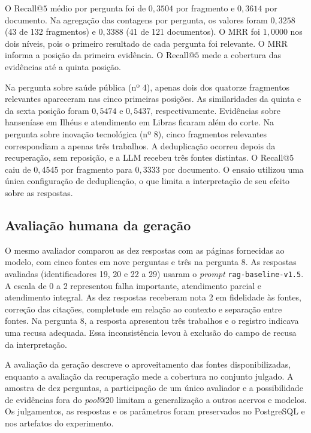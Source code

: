 O Recall@$5$ médio por pergunta foi de $0{,}3504$ por fragmento e $0{,}3614$ por documento. Na agregação das contagens por pergunta, os valores foram $0{,}3258$ (43 de 132 fragmentos) e $0{,}3388$ (41 de 121 documentos). O MRR foi $1{,}0000$ nos dois níveis, pois o primeiro resultado de cada pergunta foi relevante. O MRR informa a posição da primeira evidência. O Recall@$5$ mede a cobertura das evidências até a quinta posição.

Na pergunta sobre saúde pública (nº 4), apenas dois dos quatorze fragmentos relevantes apareceram nas cinco primeiras posições. As similaridades da quinta e da sexta posição foram $0{,}5474$ e $0{,}5437$, respectivamente. Evidências sobre hanseníase em Ilhéus e atendimento em Libras ficaram além do corte. Na pergunta sobre inovação tecnológica (nº 8), cinco fragmentos relevantes correspondiam a apenas três trabalhos. A deduplicação ocorreu depois da recuperação, sem reposição, e a LLM recebeu três fontes distintas. O Recall@$5$ caiu de $0{,}4545$ por fragmento para $0{,}3333$ por documento. O ensaio utilizou uma única configuração de deduplicação, o que limita a interpretação de seu efeito sobre as respostas.

\subsection{Avaliação humana da geração}

O mesmo avaliador comparou as dez respostas com as páginas fornecidas ao modelo, com cinco fontes em nove perguntas e três na pergunta 8. As respostas avaliadas (identificadores 19, 20 e 22 a 29) usaram o \textit{prompt} \texttt{rag-baseline-v1.5}. A escala de 0 a 2 representou falha importante, atendimento parcial e atendimento integral. As dez respostas receberam nota 2 em fidelidade às fontes, correção das citações, completude em relação ao contexto e separação entre fontes. Na pergunta 8, a resposta apresentou três trabalhos e o registro indicava uma recusa adequada. Essa inconsistência levou à exclusão do campo de recusa da interpretação.

A avaliação da geração descreve o aproveitamento das fontes disponibilizadas, enquanto a avaliação da recuperação mede a cobertura no conjunto julgado. A amostra de dez perguntas, a participação de um único avaliador e a possibilidade de evidências fora do \textit{pool}@20 limitam a generalização a outros acervos e modelos. Os julgamentos, as respostas e os parâmetros foram preservados no PostgreSQL e nos artefatos do experimento.
